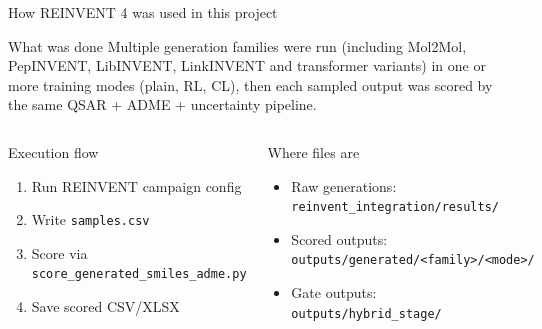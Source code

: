 \documentclass[aspectratio=169,10pt]{beamer}
\begin{document}
\begin{frame}{How REINVENT 4 was used in this project}
  \small
  \begin{block}{What was done}
    Multiple generation families were run (including Mol2Mol, PepINVENT,
    LibINVENT, LinkINVENT and transformer variants) in one or more training
    modes (plain, RL, CL), then each sampled output was scored by the same
    QSAR + ADME + uncertainty pipeline.
  \end{block}

  \begin{columns}[T]
      \begin{block}{Execution flow}
        \begin{enumerate}
          \item Run REINVENT campaign config
          \item Write \texttt{samples.csv}
          \item Score via \texttt{score\_generated\_smiles\_adme.py}
          \item Save scored CSV/XLSX
        \end{enumerate}
      \end{block}
      \begin{block}{Where files are}
        \begin{itemize}
          \item Raw generations:\\
            \texttt{reinvent\_integration/results/}
          \item Scored outputs:\\
            \texttt{outputs/generated/<family>/<mode>/}
          \item Gate outputs:\\
            \texttt{outputs/hybrid\_stage/}
        \end{itemize}
      \end{block}
  \end{columns}
\end{frame}
\end{document}
